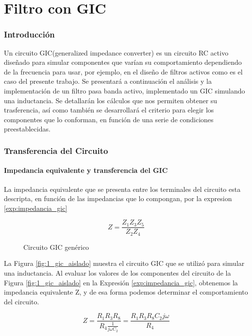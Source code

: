 \part{Filtro con GIC}
\section{Introducción}
Un circuito GIC(generalized impedance converter) es un circuito RC activo diseñado para simular componentes que varían su comportamiento dependiendo de la frecuencia para usar, por ejemplo, en el diseño de filtros activos como es el caso del presente trabajo.
Se presentará a continuación el análisis y la implementación de un filtro pasa banda activo, implementado un GIC simulando una inductancia. Se detallarán los cálculos que nos permiten obtener su trasferencia, así como también se desarrollará el criterio para elegir los componentes que lo conforman, en función de una serie de condiciones preestablecidas.

\section{Transferencia del Circuito}
\subsection{Impedancia equivalente y transferencia del GIC}

La impedancia equivalente que se presenta entre los terminales del circuito esta descripta, en función de las impedancias que lo compongan, por la expresion \ref{exp:impedancia_gic}

\begin{equation}
Z = \frac{Z_1Z_3Z_5}{Z_2Z_4}
\label{exp:impedancia_gic}
\end{equation}



\begin{figure}[h]
\centering

\caption{Circuito GIC genérico}
\label{fig:1_gic_generico}
\end{figure}

La Figura \ref{fig:1_gic_aislado} muestra el circuito GIC que se utilizó para simular una inductancia. Al evaluar los valores de los componentes del circuito de la Figura \ref{fig:1_gic_aislado} en la Expresión \ref{exp:impedancia_gic}, obtenemos la impedancia equivalente Z, y de esa forma podemos determinar el comportamiento del circuito.

\[
Z = \frac{R_1R_3R_8}{R_4 \frac{1}{j\omega C_2}} = \frac{R_1R_3R_8C_2j\omega}{R_4}
\]

